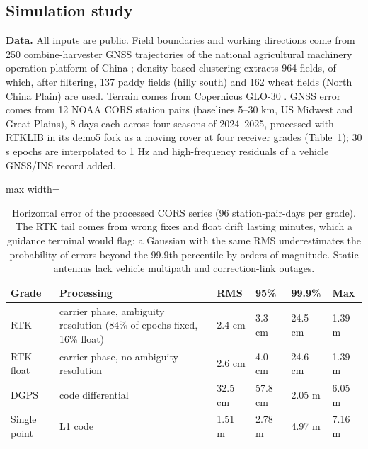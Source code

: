 \documentclass[preprint,12pt,authoryear]{elsarticle}
\begin{document}
\subsection{Simulation study}

\textbf{Data.} All inputs are public. Field boundaries and working directions come from 250 combine-harvester GNSS trajectories of the national agricultural machinery operation platform of China \citep{wu2023}; density-based clustering extracts 964 fields, of which, after filtering, 137 paddy fields (hilly south) and 162 wheat fields (North China Plain) are used. Terrain comes from Copernicus GLO-30 \citep{esa2021}. GNSS error comes from 12 NOAA CORS station pairs (baselines 5--30 km, US Midwest and Great Plains), 8 days each across four seasons of 2024--2025, processed with RTKLIB \citep{takasu2009} in its demo5 fork \citep{everett_demo5} as a moving rover at four receiver grades (Table~\ref{tab:3}); 30 s epochs are interpolated to 1 Hz and high-frequency residuals of a vehicle GNSS/INS record \citep{tang2022} added.

\begin{table}[!htbp]
\centering
\footnotesize
\caption{Horizontal error of the processed CORS series (96 station-pair-days per grade). The RTK tail comes from wrong fixes and float drift lasting minutes, which a guidance terminal would flag; a Gaussian with the same RMS underestimates the probability of errors beyond the 99.9th percentile by orders of magnitude. Static antennas lack vehicle multipath and correction-link outages.}\label{tab:3}
\begin{adjustbox}{max width=\textwidth}
\begin{tabular}{@{}l>{\raggedright\arraybackslash}p{20.8em}llll@{}}
\toprule
\textbf{Grade} & \textbf{Processing} & \textbf{RMS} & \textbf{95\%} & \textbf{99.9\%} & \textbf{Max} \\
\midrule
RTK & carrier phase, ambiguity resolution (84\% of epochs fixed, 16\% float) & 2.4 cm & 3.3 cm & 24.5 cm & 1.39 m \\
RTK float & carrier phase, no ambiguity resolution & 2.6 cm & 4.0 cm & 24.6 cm & 1.39 m \\
DGPS & code differential & 32.5 cm & 57.8 cm & 2.05 m & 6.05 m \\
Single point & L1 code & 1.51 m & 2.78 m & 4.97 m & 7.16 m \\
\bottomrule
\end{tabular}
\end{adjustbox}
\end{table}
\end{document}
